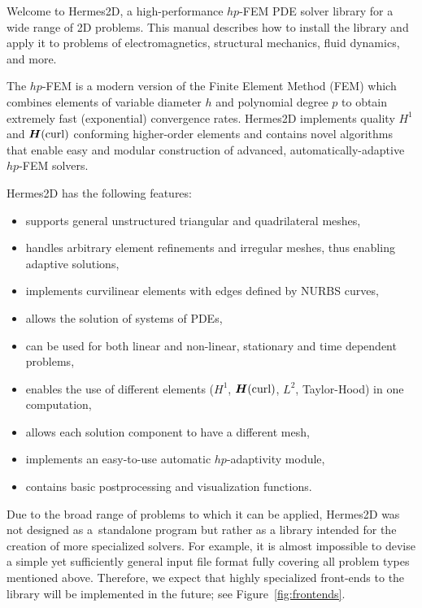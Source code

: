 
Welcome to Hermes2D, a high-performance $hp$-FEM PDE solver library for a wide range
of 2D problems. This manual describes how to install the library and apply it to
problems of electromagnetics, structural mechanics, fluid dynamics, and more.

The $hp$-FEM is a modern version of the Finite Element Method (FEM) which
combines elements of variable diameter $h$ and polynomial degree $p$ to obtain
extremely fast (exponential) convergence rates. Hermes2D implements quality $H^1$ and
${\mbox{\boldmath $H$}({\rm curl})}$ conforming higher-order elements and contains novel algorithms
that enable easy and modular construction of advanced, automatically-adaptive
$hp$-FEM solvers.

Hermes2D has the following features:
\begin{itemize}
  \item supports general unstructured triangular and quadrilateral meshes,
  \item handles arbitrary element refinements and irregular meshes, thus enabling
        adaptive solutions,
  \item implements curvilinear elements with edges defined by NURBS curves,
  \item allows the solution of systems of PDEs,
  \item can be used for both linear and non-linear, stationary and time dependent
        problems,
  \item enables the use of different elements ($H^1$, ${\mbox{\boldmath $H$}({\rm curl})}$, $L^2$, Taylor-Hood) in
        one computation,
  \item allows each solution component to have a different mesh,
  \item implements an easy-to-use automatic $hp$-adaptivity module,
  \item contains basic postprocessing and visualization functions.
\end{itemize}

Due to the broad range of problems to which it can be applied, Hermes2D was not
designed as a~standalone program but rather as a library intended for the creation
of more specialized solvers. For example, it is almost impossible to devise
a simple yet sufficiently general input file format fully covering all problem
types mentioned above. Therefore, we expect that highly specialized front-ends to
the library will be implemented in the future; see Figure~\ref{fig:frontends}.

